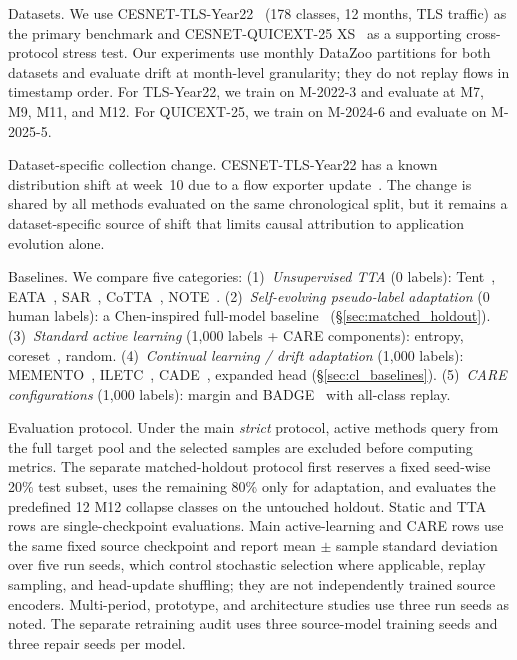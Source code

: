 \documentclass[preprint,12pt,authoryear]{elsarticle}
\let\cite\citep
\newcommand{\ours}{CARE}  %
\begin{document}
Datasets.
We use CESNET-TLS-Year22~\cite{hynek2024cesnet} (178 classes, 12 months, TLS traffic) as the primary benchmark and CESNET-QUICEXT-25 XS~\cite{cesnetquicext25,mucke2025waiting} as a supporting cross-protocol stress test.
Our experiments use monthly DataZoo partitions for both datasets and evaluate drift at month-level granularity; they do not replay flows in timestamp order.
For TLS-Year22, we train on M-2022-3 and evaluate at M7, M9, M11, and M12.
For QUICEXT-25, we train on M-2024-6 and evaluate on M-2025-5.

Dataset-specific collection change.
CESNET-TLS-Year22 has a known distribution shift at week~10 due to a flow exporter update~\cite{hynek2024cesnet}.
The change is shared by all methods evaluated on the same chronological split, but it remains a dataset-specific source of shift that limits causal attribution to application evolution alone.

Baselines.
We compare five categories:
(1)~\textit{Unsupervised TTA} (0 labels): Tent~\cite{wang2021tent}, EATA~\cite{niu2022eata}, SAR~\cite{niu2023sar}, CoTTA~\cite{wang2022cotta}, NOTE~\cite{gong2022note}.
(2)~\textit{Self-evolving pseudo-label adaptation} (0 human labels): a Chen-inspired full-model baseline~\cite{chen2025selfevolving} (\S\ref{sec:matched_holdout}).
(3)~\textit{Standard active learning} (1{,}000 labels + \ours{} components): entropy, coreset~\cite{sener2018coreset}, random.
(4)~\textit{Continual learning / drift adaptation} (1{,}000 labels): MEMENTO~\cite{cerasuolo2024memento}, ILETC~\cite{zhu2023iletc}, CADE~\cite{yang2021cade}, expanded head (\S\ref{sec:cl_baselines}).
(5)~\textit{\ours{} configurations} (1{,}000 labels): margin and BADGE~\cite{ash2020badge} with all-class replay.

Evaluation protocol.
Under the main \textit{strict} protocol, active methods query from the full target pool and the selected samples are excluded before computing metrics. The separate matched-holdout protocol first reserves a fixed seed-wise 20\% test subset, uses the remaining 80\% only for adaptation, and evaluates the predefined 12 M12 collapse classes on the untouched holdout.
Static and TTA rows are single-checkpoint evaluations.
Main active-learning and \ours{} rows use the same fixed source checkpoint and report mean $\pm$ sample standard deviation over five run seeds, which control stochastic selection where applicable, replay sampling, and head-update shuffling; they are not independently trained source encoders.
Multi-period, prototype, and architecture studies use three run seeds as noted.
The separate retraining audit uses three source-model training seeds and three repair seeds per model.
\end{document}
